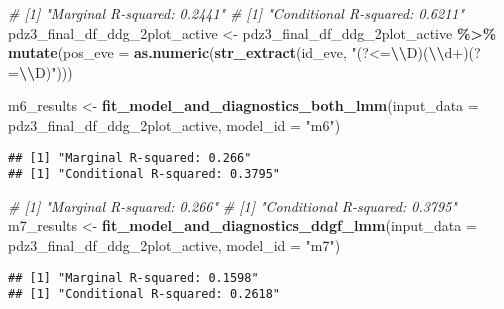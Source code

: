 \documentclass[
]{article}
\newenvironment{Shaded}{\begin{snugshade}}{\end{snugshade}}
\newcommand{\AttributeTok}[1]{\textcolor[rgb]{0.13,0.29,0.53}{#1}}
\newcommand{\CommentTok}[1]{\textcolor[rgb]{0.56,0.35,0.01}{\textit{#1}}}
\newcommand{\FunctionTok}[1]{\textcolor[rgb]{0.13,0.29,0.53}{\textbf{#1}}}
\newcommand{\NormalTok}[1]{#1}
\newcommand{\OtherTok}[1]{\textcolor[rgb]{0.56,0.35,0.01}{#1}}
\newcommand{\SpecialCharTok}[1]{\textcolor[rgb]{0.81,0.36,0.00}{\textbf{#1}}}
\newcommand{\StringTok}[1]{\textcolor[rgb]{0.31,0.60,0.02}{#1}}
\begin{document}
\begin{Shaded}
\begin{Highlighting}[]
\CommentTok{\# [1] "Marginal R{-}squared: 0.2441"}
\CommentTok{\# [1] "Conditional R{-}squared: 0.6211"}
\NormalTok{pdz3\_final\_df\_ddg\_2plot\_active }\OtherTok{\textless{}{-}}\NormalTok{ pdz3\_final\_df\_ddg\_2plot\_active }\SpecialCharTok{\%\textgreater{}\%}
  \FunctionTok{mutate}\NormalTok{(}\AttributeTok{pos\_eve =} \FunctionTok{as.numeric}\NormalTok{(}\FunctionTok{str\_extract}\NormalTok{(id\_eve, }\StringTok{"(?\textless{}=}\SpecialCharTok{\textbackslash{}\textbackslash{}}\StringTok{D)(}\SpecialCharTok{\textbackslash{}\textbackslash{}}\StringTok{d+)(?=}\SpecialCharTok{\textbackslash{}\textbackslash{}}\StringTok{D)"}\NormalTok{)))}

\NormalTok{m6\_results }\OtherTok{\textless{}{-}} \FunctionTok{fit\_model\_and\_diagnostics\_both\_lmm}\NormalTok{(}\AttributeTok{input\_data =}\NormalTok{ pdz3\_final\_df\_ddg\_2plot\_active, }\AttributeTok{model\_id =} \StringTok{"m6"}\NormalTok{)}
\end{Highlighting}
\end{Shaded}

\begin{verbatim}
## [1] "Marginal R-squared: 0.266"
## [1] "Conditional R-squared: 0.3795"
\end{verbatim}

\begin{Shaded}
\begin{Highlighting}[]
\CommentTok{\# [1] "Marginal R{-}squared: 0.266"}
\CommentTok{\# [1] "Conditional R{-}squared: 0.3795"}
\NormalTok{m7\_results }\OtherTok{\textless{}{-}} \FunctionTok{fit\_model\_and\_diagnostics\_ddgf\_lmm}\NormalTok{(}\AttributeTok{input\_data =}\NormalTok{ pdz3\_final\_df\_ddg\_2plot\_active, }\AttributeTok{model\_id =} \StringTok{"m7"}\NormalTok{)}
\end{Highlighting}
\end{Shaded}

\begin{verbatim}
## [1] "Marginal R-squared: 0.1598"
## [1] "Conditional R-squared: 0.2618"
\end{verbatim}

\begin{Shaded}
\end{Shaded}
\end{document}
